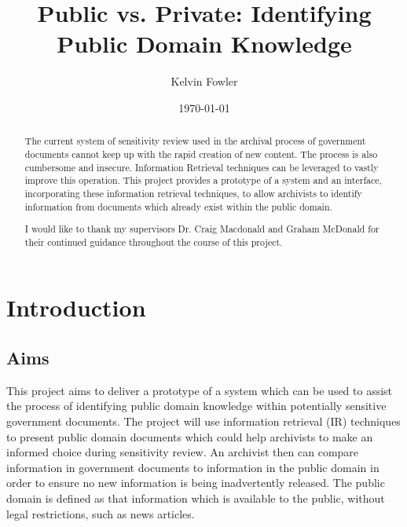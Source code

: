 \documentclass{l4proj}
\title{Public vs. Private: \newline Identifying Public Domain Knowledge}
\author{Kelvin Fowler}
\date{\today}
\begin{document}
\maketitle

\begin{abstract}
The current system of sensitivity review used in the archival process of government documents cannot keep up with the rapid creation of new content. The process is also cumbersome and insecure.
Information Retrieval techniques can be leveraged to vastly improve this operation. This project provides a prototype of a system and an interface, incorporating these information retrieval techniques, to allow archivists to identify information from documents which already exist within the public domain.
\end{abstract}

\renewcommand{\abstractname}{Acknowledgements}
\begin{abstract}
I would like to thank my supervisors Dr. Craig Macdonald and Graham McDonald for their continued guidance throughout the course of this project.
\end{abstract}

\educationalconsent
\tableofcontents

\chapter{Introduction}

\section{Aims}
This project aims to deliver a prototype of a system which can be used to assist the process of identifying public domain knowledge within potentially sensitive government documents. The project will use information retrieval (IR) techniques to present public domain documents which could help archivists to make an informed choice during sensitivity review. An archivist then can compare information in government documents to information in the public domain in order to ensure no new information is being inadvertently released.
The public domain is defined as that information which is available to the public, without legal restrictions, such as news articles.
\end{document}
